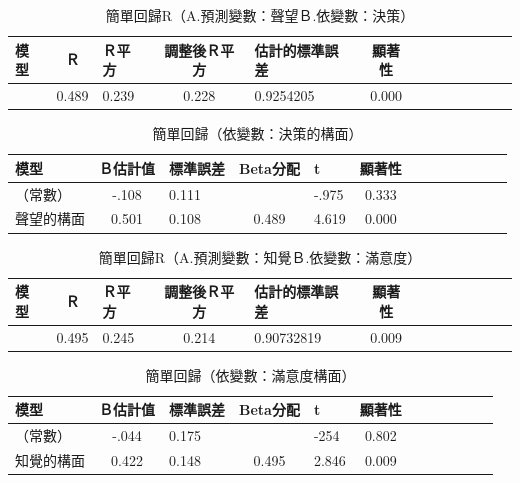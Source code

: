 \begin{table}[htb]
\caption{簡單回歸R（A.預測變數：聲望Ｂ.依變數：決策）}
\label{tab:HR4}
\centering
\renewcommand{\arraystretch}{1.2} %
\arrayrulewidth=1pt               %
\tabcolsep=10pt                   %
\begin{tabular}[t]{lclclclclclcl}  %
\hline
 模型&Ｒ&Ｒ平方&調整後Ｒ平方&估計的標準誤差&顯著性\\
\hline
&0.489&0.239&0.228&0.9254205&0.000\\
\hline
\end{tabular}
\end{table}


\begin{table}[htb]
\caption{簡單回歸（依變數：決策的構面）}
\label{tab:H4}
\centering
\renewcommand{\arraystretch}{1.2} %
\arrayrulewidth=1pt               %
\tabcolsep=10pt                   %
\begin{tabular}[t]{lclclclclclcl}  %
\hline
 模型&Ｂ估計值&標準誤差&Beta分配&t&顯著性\\
\hline
（常數）&-.108&0.111& &-.975&0.333\\
聲望的構面&0.501&0.108&0.489&4.619&0.000\\
\hline
\end{tabular}
\end{table}


\begin{table}[htb]
\caption{簡單回歸R（A.預測變數：知覺Ｂ.依變數：滿意度）}
\label{tab:HR5}
\centering
\renewcommand{\arraystretch}{1.2} %
\arrayrulewidth=1pt               %
\tabcolsep=10pt                   %
\begin{tabular}[t]{lclclclclclcl}  %
\hline
 模型&Ｒ&Ｒ平方&調整後Ｒ平方&估計的標準誤差&顯著性\\
\hline
&0.495&0.245&0.214&0.90732819&0.009\\
\hline
\end{tabular}
\end{table}

\begin{table}[htb]
\caption{簡單回歸（依變數：滿意度構面）}
\label{tab:H5}
\centering
\renewcommand{\arraystretch}{1.2} %
\arrayrulewidth=1pt               %
\tabcolsep=10pt                   %
\begin{tabular}[t]{lclclclclclc|}  %
\hline
 模型&Ｂ估計值&標準誤差&Beta分配&t&顯著性\\
\hline
（常數）&-.044&0.175&&-254&0.802\\
知覺的構面&0.422&0.148&0.495&2.846&0.009\\
\hline
\end{tabular}
\end{table}

